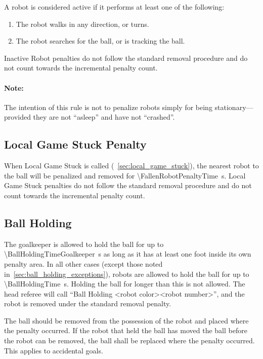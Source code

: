 A robot is considered active if it performs at least one of the following:
\begin{enumerate}
  \item The robot walks in any direction, or turns.
  \item The robot searches for the ball, or is tracking the ball.
\end{enumerate}

Inactive Robot penalties do not follow the standard removal procedure and do not count towards the incremental penalty count.

\paragraph{Note:} The intention of this rule is not to penalize robots simply for being stationary—provided they are not ``asleep'' and have not ``crashed''.

\subsection{Local Game Stuck Penalty}
\label{sec:pen_local_game_stuck}

When Local Game Stuck is called (\cf~\cref{sec:local_game_stuck}), the nearest robot to the ball will be penalized and removed for \qty{\FallenRobotPenaltyTime}{\second}. Local Game Stuck penalties do not follow the standard removal procedure and do not count towards the incremental penalty count.

\subsection{Ball Holding}
\label{sec:ball_holding}

The goalkeeper is allowed to hold the ball for up to \qty{\BallHoldingTimeGoalkeeper}{\second} as long as it has at least one foot inside its own penalty area. In all other cases (except those noted in~\cref{sec:ball_holding_exceptions}), robots are allowed to hold the ball for up to \qty{\BallHoldingTime}{\second}. Holding the ball for longer than this is not allowed. The head referee will call ``Ball Holding \textless robot color\textgreater \textless robot number\textgreater'', and the robot is removed under the standard removal penalty.

The ball should be removed from the possession of the robot and placed where the penalty occurred. If the robot that held the ball has moved the ball before the robot can be removed, the ball shall be replaced where the penalty occurred. This applies to accidental goals.

